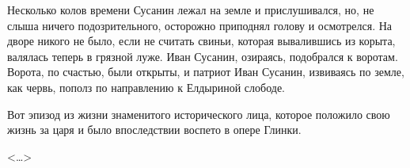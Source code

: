 \documentclass{article}
\begin{document}
Несколько колов времени Сусанин лежал на земле и прислушивался, но, не слыша ничего подозрительного, осторожно приподнял голову и осмотрелся. На дворе никого не  было, если не считать  свиньи, которая вывалившись из корыта, валялась теперь в грязной луже. Иван Сусанин, озираясь, подобрался к воротам. Ворота, по счастью, были открыты, и патриот Иван Сусанин, извиваясь по земле, как червь, пополз по направлению к Елдыриной слободе.
    
Вот эпизод из жизни знаменитого исторического лица, которое положило свою жизнь за царя и было впоследствии воспето в опере Глинки.

\begin{flushright}<\dots>\end{flushright}
\end{document}
